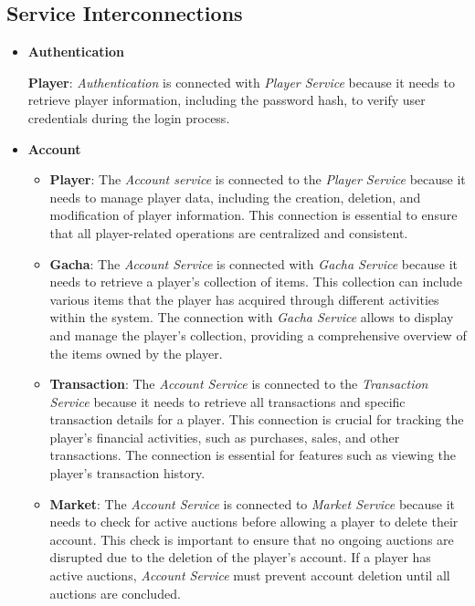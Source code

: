 \documentclass{article}
\begin{document}
\subsection{Service Interconnections}
\begin{itemize}
    \item \textbf{Authentication}
        \begin{itemize}
            \textbf{Player}: \emph{Authentication} is connected with \emph{Player Service} because it needs to retrieve player information, including the password hash, to verify user credentials during the login process. 
        \end{itemize}
    \item \textbf{Account}
        \begin{itemize}
            \item \textbf{Player}: The \emph{Account service} is connected to the \emph{Player Service} because it needs to manage player data, including the creation, deletion, and modification of player information. This connection is essential to ensure that all player-related operations are centralized and consistent.
            \item \textbf{Gacha}: The \emph{Account Service} is connected with \emph{Gacha Service} because it needs to retrieve a player's collection of items. This collection can include various items that the player has acquired through different activities within the system. The connection with \emph{Gacha Service} allows to display and manage the player's collection, providing a comprehensive overview of the items owned by the player.
            \item \textbf{Transaction}: The \emph{Account Service} is connected to the \emph{Transaction Service} because it needs to retrieve all transactions and specific transaction details for a player. This connection is crucial for tracking the player's financial activities, such as purchases, sales, and other transactions. The connection is essential for features such as viewing the player's transaction history.
            \item \textbf{Market}: The \emph{Account Service} is connected to \emph{Market Service} because it needs to check for active auctions before allowing a player to delete their account. This check is important to ensure that no ongoing auctions are disrupted due to the deletion of the player's account. If a player has active auctions, \emph{Account Service} must prevent account deletion until all auctions are concluded.
        \end{itemize} 

\end{itemize}
\end{document}
